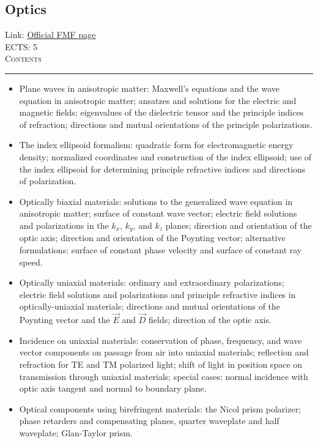 \documentclass[11pt, a4paper]{article}
\newenvironment{course}[3]{
\subsection{#1}%
Link: \href{#2}{Official FMF page}\\%
ECTS: #3%
\vspace{1ex}
\\
{\large \textsc{Contents}}\\[-0.9ex]%
\rule{\textwidth}{0.5pt}
\vspace{-3ex}
}
{}
\newenvironment{chapter}[1]{
\begin{tcolorbox}[title=#1, breakable]
}
{\end{tcolorbox}}
\begin{document}
\begin{course}{Optics}{https://www.fmf.uni-lj.si/en/study-physics/programmes/1fiz/2020/7000777/courses/1165/}{5}
\begin{chapter}{Optically anisotropic materials}
\begin{itemize}
            \item Plane waves in anisotropic matter: Maxwell's equations and the wave equation in anisotropic matter; ansatzes and solutions for the electric and magnetic fields; eigenvalues of the dielectric tensor and the principle indices of refraction; directions and mutual orientations of the principle polarizations.

            \item The index ellipsoid formalism: quadratic form for electromagnetic energy density; normalized coordinates and construction of the index ellipsoid; use of the index ellipsoid for determining principle refractive indices and directions of polarization.

            \item Optically biaxial materials: solutions to the generalized wave equation in anisotropic matter; surface of constant wave vector; electric field solutions and polarizations in the $ k_{x} $, $ k_{y} $, and $ k_{z} $ planes; direction and orientation of the optic axis; direction and orientation of the Poynting vector; alternative formulations: surface of constant phase velocity and surface of constant ray speed.

            \item Optically uniaxial materials: ordinary and extraordinary polarizations; electric field solutions and polarizations and principle refractive indices in optically-uniaxial materials; directions and mutual orientations of the Poynting vector and the $ \vec{E} $ and $ \vec{D} $ fields; direction of the optic axis.

            \item Incidence on uniaxial materials: conservation of phase, frequency, and wave vector components on passage from air into uniaxial materials; reflection and refraction for TE and TM polarized light; shift of light in position space on transmission through uniaxial materials; special cases: normal incidence with optic axis tangent and normal to boundary plane.

            \item Optical components using birefringent materials: the Nicol prism polarizer; phase retarders and compensating planes, quarter waveplate and half waveplate; Glan-Taylor prism.
        
        \end{itemize}
    \end{chapter}

    \begin{chapter}{Introduction to lasers}
        \begin{itemize}
        

\end{itemize}
\end{chapter}
\end{course}
\end{document}
